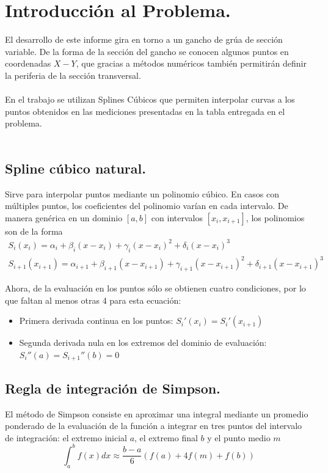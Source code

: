 \documentclass[12pt, notitlepage]{article}
\begin{document}
\section{Introducción al Problema.}

El desarrollo de este informe gira en torno a un gancho de grúa de sección variable. De la forma de la sección del gancho se conocen algunos puntos en coordenadas $X-Y$, que gracias a métodos numéricos también permitirán definir la periferia de la sección transversal.\\\\
En el trabajo se utilizan Splines Cúbicos que permiten interpolar curvas a los puntos obtenidos en las mediciones presentadas en la tabla entregada en el problema.\\\\
\subsection{Spline cúbico natural.}

Sirve para interpolar puntos mediante un polinomio cúbico. En casos con múltiples puntos, los coeficientes del polinomio varían en cada intervalo. De manera genérica en un dominio $[a,b]$ con intervalos $[x_i,x_{i+1}]$, los polinomios son de la forma
\begin{gather}
S_i(x_i) = \alpha_i + \beta_i(x-x_i) + \gamma_i(x-x_i)^2 + \delta_i(x-x_i)^3 \\
S_{i+1}(x_{i+1}) = \alpha_{i+1} + \beta_{i+1}(x-x_{i+1}) + \gamma_{i+1}(x-x_{i+1})^2 + \delta_{i+1}(x-x_{i+1})^3
\end{gather}

Ahora, de la evaluación en los puntos sólo se obtienen cuatro condiciones, por lo que faltan al menos otras 4 para esta ecuación:
\begin{itemize}
\item{Primera derivada continua en los puntos: $S_i'(x_i) = S_i'(x_{i+1})$}
\item{Segunda derivada nula en los extremos del dominio de evaluación: $S_i''(a) = S_{i+1}''(b) = 0$}
\end{itemize}

\subsection{Regla de integración de Simpson.}
El método de Simpson consiste en aproximar una integral mediante un promedio ponderado de la evaluación de la función a integrar en tres puntos del intervalo de integración: el extremo inicial $a$, el extremo final $b$ y el punto medio $m$
\begin{equation}
\int_a^b f(x) dx \approx \frac{b-a}{6}\left(f(a) + 4f(m)+f(b)\right)
\end{equation}
\end{document}
